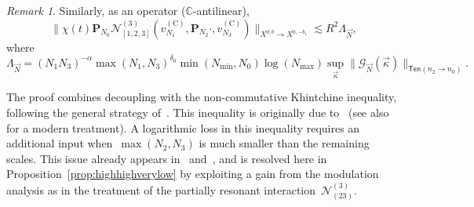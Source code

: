 \documentclass[11pt,reqno,english]{amsart}
\numberwithin{equation}{section}
\theoremstyle{plain}
\theoremstyle{definition}
\theoremstyle{remark}
\newtheorem{remark}[theorem]{Remark}
\begin{document}
\begin{remark}\label{prop:random-opdyadicremark}
	Similarly, as an operator ($\mathbb{C}$-antilinear),
	\[
	\|\chi(t)\mathbf{P}_{N_0}\mathcal{N}_{[1,2,3]}^{(3)}(v_{N_1}^{(\mathrm{C})},\mathbf{P}_{N_2}\cdot,v_{N_3}^{(\mathrm{C})}) \|_{X^{0,b}\to X^{0,-b_1}}\lesssim R^2\Lambda_{\vec{N}},
	\]
	where
	\[
	\Lambda_{\vec{N}}=(N_1N_3)^{-\alpha}\max(N_1,N_3)^{\delta_0}\min(N_{\mathrm{min}},N_0)\log(N_{\mathrm{max}})\sup_{\vec{\kappa}}\|\mathcal{G}_{\vec{N}}(\vec{\kappa})\|_{\mathsf{Ten}(n_{2}\to n_{0})}.
	\]
\end{remark}

The proof combines decoupling with the non-commutative Khintchine inequality, following the general strategy of~\cite{Kan25}. This inequality is originally due to~\cite{HP93} (see also~\cite{vHan17} for a modern treatment).
A logarithmic loss in this inequality requires an additional input when~$\max(N_{2},N_{3})$ is much smaller than the remaining scales.
This issue already appears in~\cite[Claim~5.2]{DNY24} and~\cite[Proposition~5.1]{BR25}, and is resolved here in Proposition~\ref{prop:highhighverylow} by exploiting a gain from the modulation analysis as  in the treatment of the partially resonant interaction~$\mathcal{N}_{(23)}^{(3)}$. 
\end{document}
